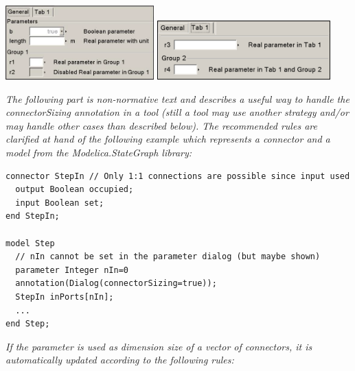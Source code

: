 \documentclass[10pt,a4paper]{report}
\begin{document}
\includegraphics[width=2.25in,height=1.125in]{media/disabledparameter}
\includegraphics[width=2.625in,height=0.89583in]{media/tabparameter}

\emph{The following part is non-normative text and describes a useful
way to handle the connectorSizing annotation in a tool (still a tool may
use another strategy and/or may handle other cases than described
below). The recommended rules are clarified at hand of the following
example which represents a connector and a model from the
Modelica.StateGraph library:}

\begin{lstlisting}[language=modelica]
connector StepIn // Only 1:1 connections are possible since input used
  output Boolean occupied;
  input Boolean set;
end StepIn;

model Step
  // nIn cannot be set in the parameter dialog (but maybe shown)
  parameter Integer nIn=0
  annotation(Dialog(connectorSizing=true));
  StepIn inPorts[nIn];
  ...
end Step;
\end{lstlisting}
\emph{If the parameter is used as dimension size of a {vector of
connectors}, it is automatically updated according to the following
rules:}
\end{document}
